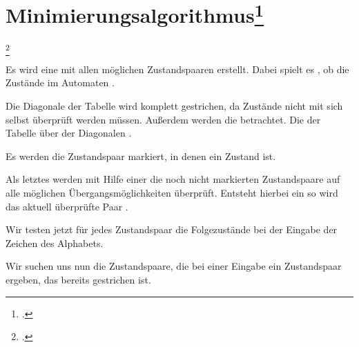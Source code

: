 \documentclass{lehramt-informatik-haupt}
\begin{document}

\section{Minimierungsalgorithmus\footcite[Seite 47-57]{vossen}}

\footcite[Seite 51-62]{theo:fs:1}

Es wird eine  mit allen möglichen
Zustandspaaren erstellt. Dabei spielt es , ob die
Zustände im Automaten .

Die Diagonale der Tabelle wird komplett gestrichen, da Zustände nicht
mit sich selbst überprüft werden müssen. Außerdem werden die
 betrachtet. Die 
der Tabelle über der Diagonalen .

Es werden die Zustandspaar markiert, in denen ein Zustand  ist.

Als letztes werden mit Hilfe einer  die noch
nicht markierten Zustandspaare auf alle möglichen Übergangsmöglichkeiten
überprüft. Entsteht hierbei ein  so
wird das aktuell überprüfte Paar .

Wir testen jetzt für jedes Zustandspaar die Folgezustände bei der
Eingabe der Zeichen des Alphabets.

Wir suchen uns nun die Zustandspaare, die bei einer Eingabe ein
Zustandspaar ergeben, das bereits gestrichen ist.


\literatur
\end{document}
